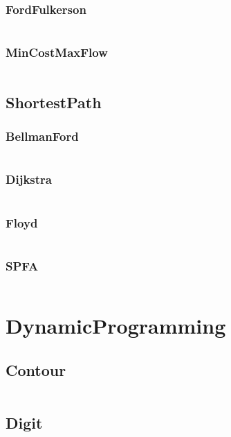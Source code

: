 \documentclass[a4paper,11pt]{article}
\begin{document}
\subsubsection{FordFulkerson}
\inputminted[breaklines]{c++}{Template/04++GraphTheory/+NetworkFlow/+FordFulkerson.cpp}
\subsubsection{MinCostMaxFlow}
\inputminted[breaklines]{c++}{Template/04++GraphTheory/+NetworkFlow/+MinCostMaxFlow.cpp}

\subsection{ShortestPath}
\subsubsection{BellmanFord}
\inputminted[breaklines]{c++}{Template/04++GraphTheory/+ShortestPath/+BellmanFord.cpp}
\subsubsection{Dijkstra}
\inputminted[breaklines]{c++}{Template/04++GraphTheory/+ShortestPath/+Dijkstra.cpp}
\subsubsection{Floyd}
\inputminted[breaklines]{c++}{Template/04++GraphTheory/+ShortestPath/+Floyd.cpp}
\subsubsection{SPFA}
\inputminted[breaklines]{c++}{Template/04++GraphTheory/+ShortestPath/+SPFA.cpp}


\newpage
\section{DynamicProgramming}
\subsection{Contour}
\inputminted[breaklines]{c++}{Template/05++DynamicProgramming/+Contour.cpp}
\subsection{Digit}
\inputminted[breaklines]{c++}{Template/05++DynamicProgramming/+Digit.cpp}
\end{document}
